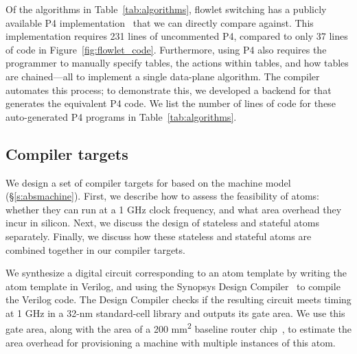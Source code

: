 Of the algorithms in Table~\ref{tab:algorithms}, flowlet switching has a
publicly available P4 implementation~\cite{p4_flowlet} that we can directly
compare against. This implementation requires 231 lines of uncommented P4,
compared to only 37 lines of \pktlanguage code in
Figure~\ref{fig:flowlet_code}. Furthermore, using P4 also requires the
programmer to manually specify tables, the actions within tables, and how
tables are chained---all to implement a single data-plane algorithm. The
\pktlanguage compiler automates this process; to demonstrate this, we developed
a backend for \pktlanguage that generates the equivalent P4 code. We list the
number of lines of code for these auto-generated P4 programs in
Table~\ref{tab:algorithms}.
\subsection{Compiler targets}
\label{ss:targets}

We design a set of compiler targets for \pktlanguage based on the \absmachine
machine model (\S\ref{s:absmachine}). First, we describe how to assess the
feasibility of atoms: whether they can run at a 1 GHz clock frequency, and what
area overhead they incur in silicon. Next, we discuss the design of stateless
and stateful atoms separately. Finally, we discuss how these stateless and
stateful atoms are combined together in our compiler targets.

We synthesize a digital circuit corresponding to an atom template by writing
the atom template in Verilog, and using the Synopsys Design
Compiler~\cite{synopsys_dc} to compile the Verilog code. The Design Compiler
checks if the resulting circuit meets timing at 1 GHz in a 32-nm standard-cell
library and outputs its gate area. We use this gate area, along with the area
of a 200 \si{\milli\metre\squared} baseline router chip~\cite{gibb_parsing}, to
estimate the area overhead for provisioning a \absmachine machine with multiple
instances of this atom.


